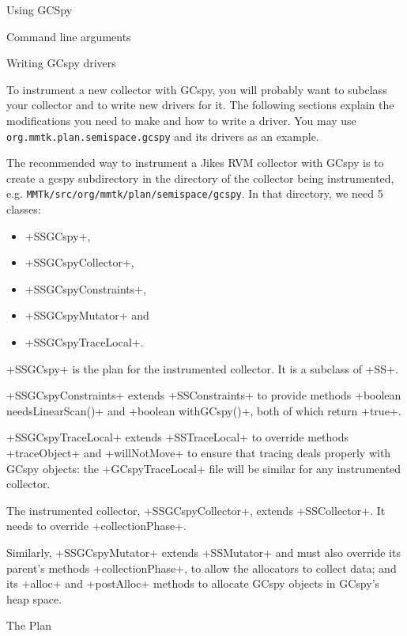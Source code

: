 \begin{section}{Using GCSpy}
\begin{subsection}{Command line arguments}
\end{subsection}

\begin{subsection}{Writing GCspy drivers}

To instrument a new collector with GCspy, you will probably want to subclass your collector and to write new drivers for it. The following sections explain the modifications you need to make and how to write a driver. You may use \texttt{org.mmtk.plan.se\-mi\-spa\-ce.gc\-spy} and its drivers as an example.

The recommended way to instrument a Jikes RVM collector with GCspy is to create a gcspy subdirectory in the directory of the collector being instrumented, e.g. \texttt{MMTk/src/org/mmtk/plan/se\-mi\-spa\-ce/gc\-spy}. In that directory, we need 5 classes:
\begin{itemize}
  \item \spverb+SSGCspy+,
  \item \spverb+SSGCspyCollector+,
  \item \spverb+SSGCspyConstraints+,
  \item \spverb+SSGCspyMutator+ and
  \item \spverb+SSGCspyTraceLocal+.
\end{itemize}

\spverb+SSGCspy+ is the plan for the instrumented collector. It is a subclass of \spverb+SS+.

\spverb+SSGCspyConstraints+ extends \spverb+SSConstraints+ to provide methods \spverb+boolean needsLinearScan()+ and \spverb+boolean withGCspy()+, both of which return \spverb+true+.

\spverb+SSGCspyTraceLocal+ extends \spverb+SSTraceLocal+ to override methods \spverb+traceObject+ and \spverb+willNotMove+ to ensure that tracing deals properly with GCspy objects: the \spverb+GCspyTraceLocal+ file will be similar for any instrumented collector.

The instrumented collector, \spverb+SSGCspyCollector+, extends \spverb+SSCollector+. It needs to override \spverb+collectionPhase+.

Similarly, \spverb+SSGCspyMutator+ extends \spverb+SSMutator+ and must also override its parent's methods \spverb+collectionPhase+, to allow the allocators to collect data; and its \spverb+alloc+ and \spverb+postAlloc+ methods to allocate GCspy objects in GCspy's heap space.

\begin{subsubsection}{The Plan}


\end{subsubsection}
\end{subsection}
\end{section}
